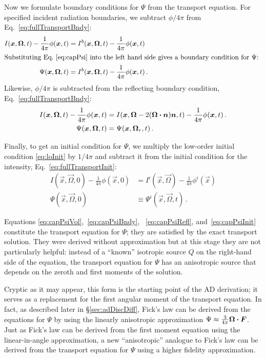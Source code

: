 Now we formulate boundary conditions for $\Psi$ from the transport equation.
For specified incident radiation boundaries, we subtract $\phi/4\pi$ from 
Eq.~\eqref{eq:fullTransportBndy}:
\begin{align}\nonumber
  I(\vec{x}, \vec{\Omega}, t) - \frac{1}{4\pi} \phi(\vec{x}, t)
  &= I^b(\vec{x}, \vec{\Omega}, t) - \frac{1}{4\pi} \phi(\vec{x}, t)
  \\ 
  \intertext{Substituting Eq.~\eqref{eq:capPsi} into the left hand side gives a
  boundary condition for $\Psi$:
  } \label{eq:capPsiBndy}
 \Psi(\vec{x}, \vec{\Omega}, t) 
  &=I^b(\vec{x}, \vec{\Omega}, t) - \frac{1}{4\pi} \phi(\vec{x}, t)\,.
\end{align}
Likewise, $\phi/4\pi$ is subtracted from the reflecting boundary condition, 
Eq.~\eqref{eq:fullTransportBndy}:
\begin{align}\nonumber
  I(\vec{x}, \vec{\Omega}, t) - \frac{1}{4\pi} \phi(\vec{x}, t)
  &= I(\vec{x}, \vec{\Omega} - 2(\vec{\Omega} \vd \vec{n}) \vec{n}, t)
   - \frac{1}{4\pi} \phi(\vec{x}, t)\,.
  \\ \label{eq:capPsiRefl}
 \Psi(\vec{x}, \vec{\Omega}, t) 
  &= \Psi(\vec{x}, \vec{\Omega}_r, t)\,.
\end{align}

Finally, to get an initial condition for $\Psi$, we
multiply the low-order initial condition \eqref{eq:loInit} by $1/4\pi$ and
subtract it from the initial condition for the intensity,
Eq.~\eqref{eq:fullTransportInit}:
\begin{align}\nonumber
  I(\vec{x}, \vec{\Omega}, 0) - \frac{1}{4\pi}\phi(\vec{x}, 0)
 &= I^i(\vec{x}, \vec{\Omega}) - \frac1{4\pi} \phi^i(\vec{x})
 \\ \label{eq:capPsiInit}
 \Psi(\vec{x}, \vec{\Omega}, 0)
 &\equiv \Psi^i(\vec{x}, \vec{\Omega}, t)
 \,.
\end{align}

Equations \eqref{eq:capPsiVol},~\eqref{eq:capPsiBndy},%
~\eqref{eq:capPsiRefl}, and~\eqref{eq:capPsiInit} constitute the transport
equation for $\Psi$; they are satisfied by the exact transport solution. They
were derived without approximation but at this stage they are not particularly
helpful: instead of a ``known'' isotropic source $Q$ on the right-hand side of
the equation, the transport equation for $\Psi$ has an anisotropic source that
depends on the zeroth and first moments of the solution.

Cryptic as it may appear, this form is the starting point of the AD derivation;
it serves as a replacement for the first angular moment of the transport
equation.  In fact, as described later in \S\ref{sec:adDiscDiff}, Fick's law can
be derived from the equations for $\Psi$
by using the linearly anisotropic approximation \mbox{$\Psi\approx \frac{3}{4\pi}
\vec{\Omega}\vd\vec{F}$}. Just as Fick's law can be derived from the first moment
equation using the linear-in-angle approximation, a new ``anisotropic'' analogue
to Fick's law can be derived from the transport equation for $\Psi$ using a
higher fidelity approximation.

